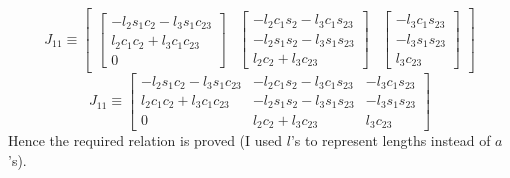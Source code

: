 \documentclass[12pt]{article}
\begin{document}
\[
  J_{11} \equiv
  \begin{bmatrix}
    \begin{bmatrix}
      -l_2s_1c_2 - l_3s_1c_{23} \\
      l_2c_1c_2 + l_3c_1c_{23} \\
      0
    \end{bmatrix}
    &
    \begin{bmatrix}
      -l_2c_1s_2 - l_3c_1s_{23} \\
      -l_2s_1s_2 - l_3s_1s_{23} \\
      l_2c_2 + l_3c_{23}
    \end{bmatrix}
    &
    \begin{bmatrix}
      -l_3c_1s_{23}\\
      -l_3s_1s_{23}\\
      l_3c_{23}
    \end{bmatrix}
  \end{bmatrix}
\]
\[
  J_{11} \equiv
    \begin{bmatrix}
      -l_2s_1c_2 - l_3s_1c_{23} & -l_2c_1s_2 - l_3c_1s_{23} & -l_3c_1s_{23}\\
      l_2c_1c_2 + l_3c_1c_{23}  & -l_2s_1s_2 - l_3s_1s_{23} & -l_3s_1s_{23}\\
      0                         & l_2c_2 + l_3c_{23}        & l_3c_{23}
    \end{bmatrix}
\]
Hence the required relation is proved (I used $l$'s to represent lengths instead of $a$'s).

\pagebreak
\end{document}
